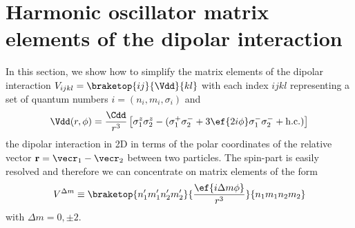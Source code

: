 \chapter{Harmonic oscillator matrix elements of the dipolar interaction}

In this section, we show how to simplify the matrix elements of the dipolar interaction $V_{ijkl}=\braketop{ij}{\Vdd}{kl}$ with each index $ijkl$ representing a set of quantum numbers $i=(n_i,m_i,\sigma_i)$ and
\begin{align*}
\Vdd(r,\phi) =  \frac{\Cdd}{r^3} \left[
\sigma^z_1 \sigma^z_2 - (\sigma^+_1 \sigma^-_2 +3 \ef{2i\phi} \sigma^-_1 \sigma^-_2  +\text{h.c.})
\right]
\end{align*}
the dipolar interaction in 2D in terms of the polar coordinates of the relative vector $\vec{r}=\vecr_1-\vecr_2$ between two particles. The spin-part is easily resolved and therefore we can concentrate on matrix elements of the form
\begin{align*}
V^{\Delta m}\equiv\braketop{n_1'm_1'n_2'm_2'}{\frac{\ef{i\Delta m\phi}}{r^3}}{n_1m_1n_2m_2}
\end{align*}
with $\Delta m = 0, \pm 2$.

